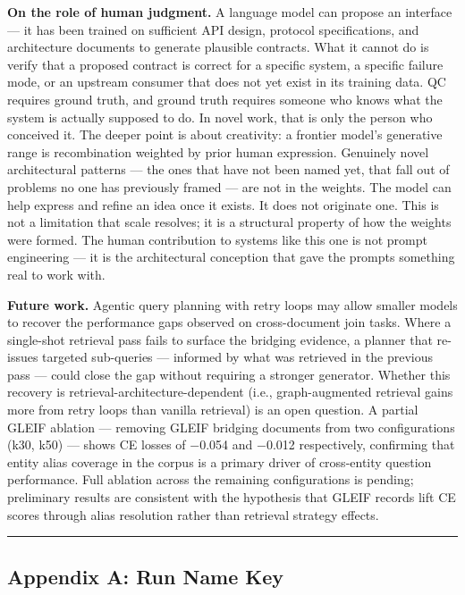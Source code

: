\documentclass[
]{article}
\begin{document}
\textbf{On the role of human judgment.} A language model can propose an
interface --- it has been trained on sufficient API design, protocol
specifications, and architecture documents to generate plausible
contracts. What it cannot do is verify that a proposed contract is
correct for a specific system, a specific failure mode, or an upstream
consumer that does not yet exist in its training data. QC requires
ground truth, and ground truth requires someone who knows what the
system is actually supposed to do. In novel work, that is only the
person who conceived it. The deeper point is about creativity: a
frontier model's generative range is recombination weighted by prior
human expression. Genuinely novel architectural patterns --- the ones
that have not been named yet, that fall out of problems no one has
previously framed --- are not in the weights. The model can help express
and refine an idea once it exists. It does not originate one. This is
not a limitation that scale resolves; it is a structural property of how
the weights were formed. The human contribution to systems like this one
is not prompt engineering --- it is the architectural conception that
gave the prompts something real to work with.

\textbf{Future work.} Agentic query planning with retry loops may allow
smaller models to recover the performance gaps observed on
cross-document join tasks. Where a single-shot retrieval pass fails to
surface the bridging evidence, a planner that re-issues targeted
sub-queries --- informed by what was retrieved in the previous pass ---
could close the gap without requiring a stronger generator. Whether this
recovery is retrieval-architecture-dependent (i.e., graph-augmented
retrieval gains more from retry loops than vanilla retrieval) is an open
question. A partial GLEIF ablation --- removing GLEIF bridging documents
from two configurations (k30, k50) --- shows CE losses of −0.054 and
−0.012 respectively, confirming that entity alias coverage in the corpus
is a primary driver of cross-entity question performance. Full ablation
across the remaining configurations is pending; preliminary results are
consistent with the hypothesis that GLEIF records lift CE scores through
alias resolution rather than retrieval strategy effects.

\begin{center}\rule{0.5\linewidth}{0.5pt}\end{center}

\subsection{Appendix A: Run Name Key}\label{appendix-a-run-name-key}
\end{document}

